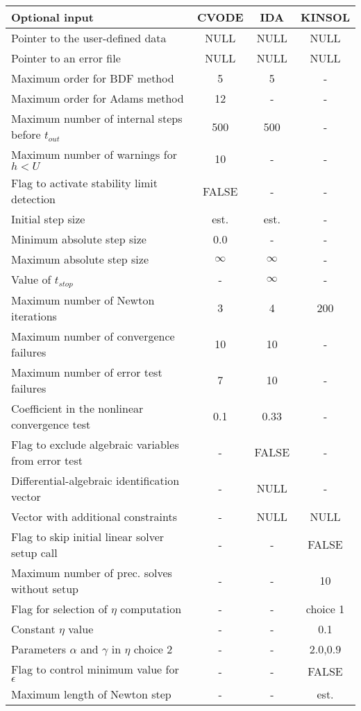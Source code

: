 \begin{acmtable}{340pt}
\centering
\begin{tabular}{p{2.75in} c c c }
Optional input & CVODE  & IDA & KINSOL \\
\hline
Pointer to the user-defined data & NULL & NULL& NULL \\
Pointer to an error file & NULL & NULL & NULL \\
Maximum order for BDF method & 5 & 5 & - \\
Maximum order for Adams method& 12  & - & - \\
Maximum number of internal steps before $t_{out}$ & 500 & 500 & - \\
Maximum number of warnings for $h < U$ & 10 & - & - \\
Flag to activate stability limit detection & FALSE & - & - \\
Initial step size & est. & est. & - \\
Minimum absolute step size & 0.0 & - & - \\
Maximum absolute step size & $\infty$ & $\infty$ & - \\
Value of $t_{stop}$ & - & $\infty$ & - \\
Maximum number of Newton iterations & 3 & 4 & 200 \\
Maximum number of convergence failures & 10 & 10 & - \\
Maximum number of error test failures & 7 & 10 & - \\
Coefficient in the nonlinear convergence test & 0.1 & 0.33 & - \\
Flag to exclude algebraic variables from error test & - & FALSE & - \\
Differential-algebraic identification vector & - & NULL & - \\
Vector with additional constraints & - & NULL & NULL \\
Flag to skip initial linear solver setup call & - & - & FALSE \\
Maximum number of prec. solves without setup & - & - & 10 \\
Flag for selection of $\eta$ computation & - & - & choice 1 \\
Constant $\eta$ value & - & - & 0.1 \\
Parameters $\alpha$ and $\gamma$ in $\eta$ choice 2 & - & - & $2.0$,$0.9$\\
Flag to control minimum value for $\epsilon$ & - & - & FALSE \\
Maximum length of Newton step & - & - & est. \\

\end{tabular}
\end{acmtable}

